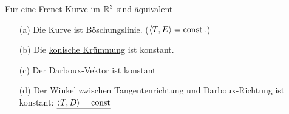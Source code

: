 \begin{satz}\label{satz139}
 Für eine Frenet-Kurve im \(\mathbb{R}^3\) sind äquivalent
 \begin{enumerate}
  \item[(a)] Die Kurve ist Böschungslinie. \big(\(\langle T, E\rangle = \operatorname{const}.\)\big)
  \item[(b)] Die \uline{konische Krümmung} \mat{\frac{\tau}{\kappa} (= \varrho \tau)} ist konstant.
  \item[(c)] Der Darboux-Vektor  ist konstant 
  \item[(d)] Der Winkel zwischen Tangentenrichtung und Darboux-Richtung ist konstant: \(\uline{\langle T, D \rangle = \const}\) 
 \end{enumerate}
\end{satz}

